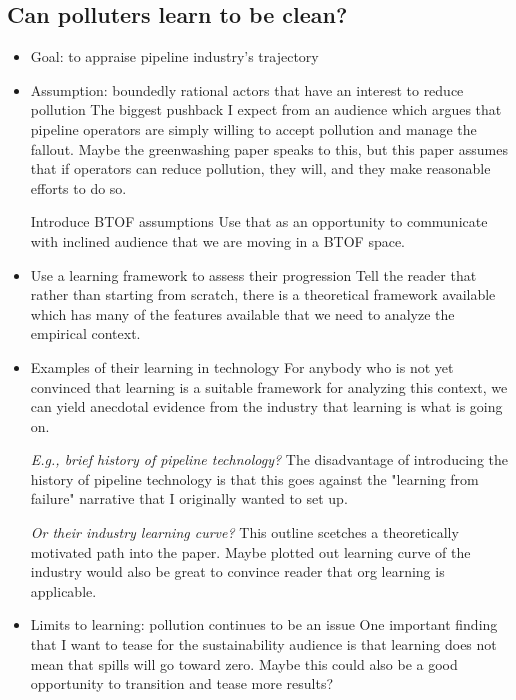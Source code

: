 	\subsection{Can polluters learn to be clean?}
	\begin{paracol}{2}
	\begin{itemize}
		\item Goal: to appraise pipeline industry's trajectory
		\switchcolumn
		\switchcolumn*
		
		\item Assumption: boundedly rational actors that have an interest to reduce pollution
		\switchcolumn The biggest pushback I expect from an audience which argues that pipeline operators are simply willing to accept pollution and manage the fallout. Maybe the greenwashing paper speaks to this, but this paper assumes that if operators can reduce pollution, they will, and they make reasonable efforts to do so.
		\switchcolumn*
		
		\subitem Introduce BTOF assumptions
		\switchcolumn Use that as an opportunity to communicate with inclined audience that we are moving in a BTOF space.
		\switchcolumn*
		
		\item Use a learning framework to assess their progression
		\switchcolumn Tell the reader that rather than starting from scratch, there is a theoretical framework available which has many of the features available that we need to analyze the empirical context.
		\switchcolumn*		
		
		\item Examples of their learning in technology
		\switchcolumn For anybody who is not yet convinced that learning is a suitable framework for analyzing this context, we can yield anecdotal evidence from the industry that learning is what is going on.
		\switchcolumn*
		
		\subitem \textit{E.g., brief history of pipeline technology?}
		\switchcolumn The disadvantage of introducing the history of pipeline technology is that this goes against the "learning from failure" narrative that I originally wanted to set up.
		\switchcolumn*
		
		\subitem \textit{Or their industry learning curve?}
		\switchcolumn This outline scetches a theoretically motivated path into the paper. Maybe plotted out learning curve of the industry would also be great to convince reader that org learning is applicable.
		\switchcolumn*
		
		\item Limits to learning: pollution continues to be an issue
		\switchcolumn One important finding that I want to tease for the sustainability audience is that learning does not mean that spills will go toward zero. Maybe this could also be a good opportunity to transition and tease more results?
	\end{itemize}
	\end{paracol}



